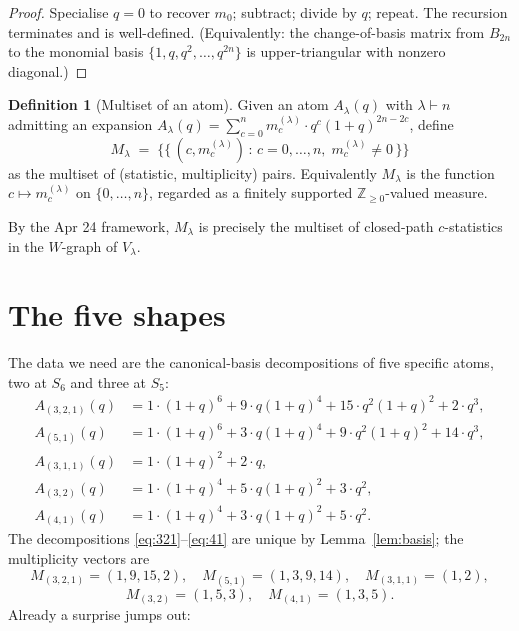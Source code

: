 \documentclass[11pt]{article}
\theoremstyle{definition}
\newtheorem{definition}[theorem]{Definition}
\begin{document}
\begin{proof}
Specialise $q = 0$ to recover $m_0$; subtract; divide by $q$; repeat. The recursion terminates and is well-defined. (Equivalently: the change-of-basis matrix from $B_{2n}$ to the monomial basis $\{1, q, q^2, \dots, q^{2n}\}$ is upper-triangular with nonzero diagonal.)
\end{proof}

\begin{definition}[Multiset of an atom]
Given an atom $A_\lambda(q)$ with $\lambda \vdash n$ admitting an expansion $A_\lambda(q) = \sum_{c=0}^{n} m_c^{(\lambda)} \cdot q^c(1+q)^{2n-2c}$, define
\[
M_\lambda \;=\; \bigl\{\!\!\bigl\{ \,(c, m_c^{(\lambda)}) \,:\, c = 0, \dots, n,\; m_c^{(\lambda)} \neq 0 \,\bigr\}\!\!\bigr\}
\]
as the multiset of (statistic, multiplicity) pairs. Equivalently $M_\lambda$ is the function $c \mapsto m_c^{(\lambda)}$ on $\{0,\dots,n\}$, regarded as a finitely supported $\mathbb{Z}_{\geq 0}$-valued measure.
\end{definition}

By the Apr 24 framework, $M_\lambda$ is precisely the multiset of closed-path $c$-statistics in the $W$-graph of $V_\lambda$.

\section{The five shapes}

The data we need are the canonical-basis decompositions of five specific atoms, two at $S_6$ and three at $S_5$:
\begin{align}
A_{(3,2,1)}(q) &= 1\cdot(1+q)^6 + 9 \cdot q(1+q)^4 + 15 \cdot q^2(1+q)^2 + 2 \cdot q^3, \label{eq:321}\\
A_{(5,1)}(q)   &= 1\cdot(1+q)^6 + 3 \cdot q(1+q)^4 + 9  \cdot q^2(1+q)^2 + 14\cdot q^3, \label{eq:51}\\
A_{(3,1,1)}(q) &= 1\cdot(1+q)^2 + 2 \cdot q, \label{eq:311}\\
A_{(3,2)}(q)   &= 1\cdot(1+q)^4 + 5 \cdot q(1+q)^2 + 3  \cdot q^2, \label{eq:32}\\
A_{(4,1)}(q)   &= 1\cdot(1+q)^4 + 3 \cdot q(1+q)^2 + 5  \cdot q^2. \label{eq:41}
\end{align}
The decompositions \eqref{eq:321}--\eqref{eq:41} are unique by Lemma~\ref{lem:basis}; the multiplicity vectors are
\[
M_{(3,2,1)} = (1,9,15,2),\quad M_{(5,1)} = (1,3,9,14), \quad M_{(3,1,1)} = (1,2),
\]
\[
M_{(3,2)} = (1,5,3), \quad M_{(4,1)} = (1,3,5).
\]
Already a surprise jumps out:
\end{document}
